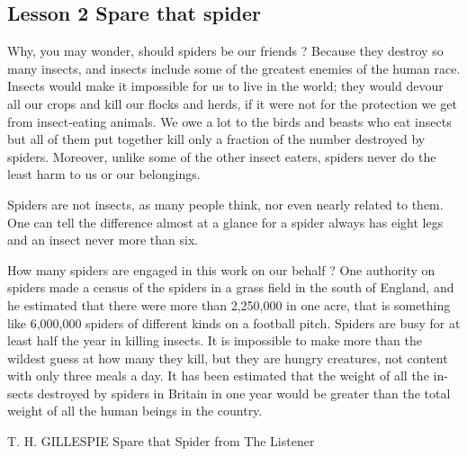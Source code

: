 \documentclass[kindlepaper]{BHCexam4kindle}
\begin{document}
\subsection{Lesson 2
Spare that spider}
\par
Why, you may wonder, should spiders be our friends ? Because they destroy so
many insects, and insects include some of the greatest enemies of the human
race. Insects would make it impossible for us to live in the world; they would
devour all our crops and kill our flocks and herds, if it were not for the protection
we get from insect-eating animals. We owe a lot to the birds and beasts who eat
insects but all of them put together kill only a fraction of the number destroyed
by spiders. Moreover, unlike some of the other insect eaters, spiders never do
the least harm to us or our belongings.
\par
Spiders are not insects, as many people think, nor even nearly related to them.
One can tell the difference almost at a glance for a spider always has eight legs
and an insect never more than six.
\par
How many spiders are engaged in this work on our behalf ? One authority on
spiders made a census of the spiders in a grass field in the south of England, and
he estimated that there were more than 2,250,000 in one acre, that is something
like 6,000,000 spiders of different kinds on a football pitch. Spiders are busy for
at least half the year in killing insects. It is impossible to make more than the
wildest guess at how many they kill, but they are hungry creatures, not content
with only three meals a day. It has been estimated that the weight of all the in-
sects destroyed by spiders in Britain in one year would be greater than the total
weight of all the human beings in the country.
\par
T. H. GILLESPIE Spare that Spider from The Listener

\clearpage
\end{document}
